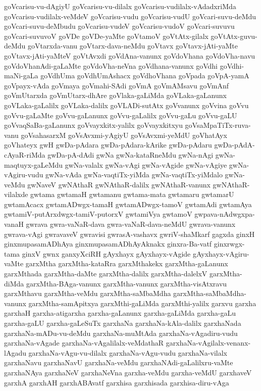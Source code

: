{goVcarisu-vu-dAgiyU
goVcarisu-vu-dilalx
goVcarisu-vudilalx-vAdadxriMda
goVcarisu-vudilalx-veMdeV
goVcarisu-vudu
goVcarisu-vudU
goVcari-suvu-deMdu
goVcari-suvu-deMbudu
goVcarisu-vudeV
goVcarisu-vudoV
goVcari-suvuvu
goVcari-suvuvoV
goVDe
goVDe-yaMte
goVtamoV
goVtAtx-gilalx
goVtAtx-guvu-deMdu
goVtarxda-vanu
goVtarx-dava-neMdu
goVtavx
goVtavx-jAti-yaMte
goVtavx-jAti-yaMteV
goVtAvxdi
goVdAna-vanunx
goVdoVhana
goVdoVha-navu
goVdoVhanAdi-gaLaMte
goVdoVha-neVna
goVdhana-vanunx
goVdhi
goVdhi-maNi-gaLa
goVdhUma
goVdhUmAshacx
goVdhoVhana
goVpada
goVpA-yamA
goVpayx-vAda
goVmaya
goVmahi-SAdi
goVmA
goVmAMsavu
goVmAnf
goVmUtarxda
goVmUtarx-dhAre
goVlaka-gaLiMda
goVLaka-gaLanunx
goVLaka-gaLalilx
goVLaka-dalilx
goVLADi-sutAtx
goVvanunx
goVvina
goVvu
goVvu-gaLaMte
goVvu-gaLanunx
goVvu-gaLalilx
goVvu-gaLu
goVvu-gaLU
goVvaqSaBa-gaLanunx
goVvayxkitx-yalilx
goVvayxkitxyu
goVsaMpaTiTx-ruva-vanu
goVsahasarxM
goVsAvxmi-yAgiyU
goVsAvxmi-yeMdU
goVhatAyx
goVhateyx
gwH
gwDa-pAdara
gwDa-pAdara-kArike
gwDa-pAdaru
gwDa-pAdA-cAyaR-riMda
gwDa-pA-dAdi
gwNa
gwNa-kataRneMdu
gwNa-nAgi
gwNa-maqtuyx-gaLeMdu
gwNa-valalx
gwNa-vAgi
gwNa-vAgide
gwNa-vAgiye
gwNa-vAgiru-vudu
gwNa-vAda
gwNa-vaqtiTx-yiMda
gwNa-vaqtiTx-yiMdalo
gwNa-veMdu
gwNaveV
gwNAthaR
gwNAthaR-dalilx
gwNAthaR-vanunx
gwNAthaR-vilalxde
gwtama
gwtamaH
gwtamanu
gwtama-mata
gwtamaru
gwtamarU
gwtamAcacx
gwtamADwgx-tamaH
gwtamADwgx-tamoV
gwtamAdi
gwtamAya
gwtamiV-putArxdwgx-tamiV-putorxV
gwtamiVya
gwtamoV
gwpava-nAdwgxpa-vanaH
gwrava
gwra-vaNaR-dava
gwra-vaNaR-dava-neMdU
gwrava-vanunx
gwrava-vAgi
gwravaveV
gwravisi
gwrasA-vashavx
gwriV-shaMkarf
gagxda
ginxH
ginxmupasamADhAya
ginxmupasamADhAyAknakx
ginxra-Ba-vatf
ginxrwgx-tama
ginxV
gwnx
ganxyXciRH
gAyxhayx
gAyxhayx-vAgide
gAyxhayx-vAgiru-vaMte
garxMtha
garxMtha-kataRra
garxMthakekx
garxMtha-gaLanunx
garxMthada
garxMtha-daMte
garxMtha-dalilx
garxMtha-dalelxV
garxMtha-diMda
garxMtha-BAga-vanunx
garxMtha-vanunx
garxMtha-visAtxravu
garxMthavu
garxMtha-veMdu
garxMtha-saMbaMdha
garxMtha-saMbaMdha-vanunx
garxMtha-samApitxya
garxMthi-gaLiMda
garxMthi-yalilx
garxvu
garxha
garxhaH
garxha-atigarxha
garxha-gaLanunx
garxha-gaLiMda
garxha-gaLu
garxha-gaLU
garxha-gaLeSuTx
garxhaNa
garxhaNa-kAla-dalilx
garxhaNada
garxhaNa-mADu-vu-deMdu
garxhaNa-muMtAda
garxhaNa-vAgadiru-vudu
garxhaNa-vAgade
garxhaNa-vAgalilalx-veMdathaR
garxhaNa-vAgilalx-venanx-lAgadu
garxhaNa-vAgu-vu-dilalx
garxhaNa-vAgu-vudu
garxhaNa-vilalx
garxhaNavu
garxhaNavU
garxhaNa-veMdu
garxhaNAdi-gaLalilxru-vaMte
garxhaNAya
garxhaNeV
garxhaNeVna
garxha-veMdu
garxha-veMdU
garxhaveV
garxhA
garxhAH
garxhABAvatf
garxhisa
garxhisada
garxhisa-diru-vAga
}

